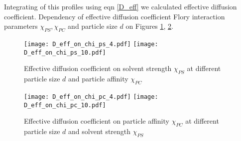 \documentclass[12pt,a4paper]{article}
\begin{document}
Integrating of this profiles using eqn \ref{D_eff} we calculated effective diffusion coefficient. Dependency of effective diffusion coefficient Flory interaction parameters $\chi_{PS}, \chi_{PC}$ and particle size $d$ on Figures \ref{fig:D_eff_on_chi_ps}, \ref{fig:D_eff_on_chi_pc}.

\begin{figure}
    \center
    \hspace*{-0.3in}
    \texttt{[image: D\_eff\_on\_chi\_ps\_4.pdf]}
    \hspace*{-0.6in}
    \texttt{[image: D\_eff\_on\_chi\_ps\_10.pdf]}

    \caption{Effective diffusion coefficient on solvent strength $\chi_{PS}$ at different particle size $d$ and particle affinity $\chi_{PC}$}
    \label{fig:D_eff_on_chi_ps}
\end{figure}

\begin{figure}
    \center
    \hspace*{-0.3in}
    \texttt{[image: D\_eff\_on\_chi\_pc\_4.pdf]}
    \hspace*{-0.6in}
    \texttt{[image: D\_eff\_on\_chi\_pc\_10.pdf]}

    \caption{Effective diffusion coefficient on particle affinity $\chi_{PC}$ at different particle size $d$ and solvent strength $\chi_{PS}$}
    \label{fig:D_eff_on_chi_pc}
\end{figure}
\end{document}
